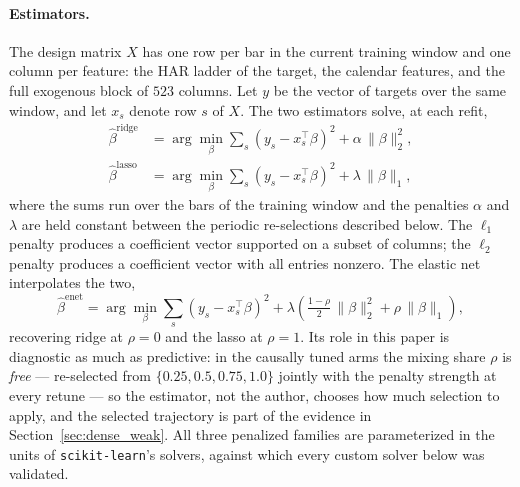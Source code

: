 \paragraph{Estimators.}
The design matrix $X$ has one row per bar in the current training window
and one column per feature: the HAR ladder of the target, the calendar
features, and the full exogenous block of $523$ columns. Let $y$
be the vector of targets over the same window, and let $x_s$ denote row $s$
of $X$. The two estimators solve, at each refit,
\begin{align*}
\hat\beta^{\mathrm{ridge}} &= \arg\min_{\beta}
  \sum_{s} \left( y_s - x_s^\top \beta \right)^2
  + \alpha \,\lVert \beta \rVert_2^2, \\
\hat\beta^{\mathrm{lasso}} &= \arg\min_{\beta}
  \sum_{s} \left( y_s - x_s^\top \beta \right)^2
  + \lambda \,\lVert \beta \rVert_1,
\end{align*}
where the sums run over the bars of the training window and the penalties
$\alpha$ and $\lambda$ are held constant between the periodic re-selections
described below. The $\ell_1$ penalty produces a coefficient vector
supported on a subset of columns; the $\ell_2$ penalty produces a
coefficient vector with all entries nonzero. The elastic net
\citep{ZouHastie2005} interpolates the two,
\begin{equation*}
\hat\beta^{\mathrm{enet}} = \arg\min_{\beta}
  \sum_{s} \left( y_s - x_s^\top \beta \right)^2
  + \lambda \left( \tfrac{1 - \rho}{2}\, \lVert \beta \rVert_2^2
  + \rho\, \lVert \beta \rVert_1 \right),
\end{equation*}
recovering ridge at $\rho = 0$ and the lasso at $\rho = 1$. Its role in
this paper is diagnostic as much as predictive: in the causally tuned
arms the mixing share $\rho$ is \emph{free} --- re-selected from
$\{0.25, 0.5, 0.75, 1.0\}$ jointly with the penalty strength at every
retune --- so the estimator, not the author, chooses how much selection
to apply, and the selected trajectory is part of the evidence in
Section~\ref{sec:dense_weak}. All three penalized families are
parameterized in the units of \texttt{scikit-learn}'s solvers, against
which every custom solver below was validated.


